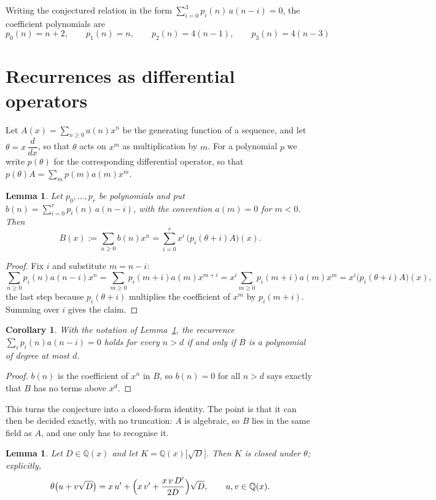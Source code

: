 \documentclass[11pt,a4paper]{article}
\theoremstyle{plain}
\newtheorem{lemma}[theorem]{Lemma}
\newtheorem{corollary}[theorem]{Corollary}
\theoremstyle{definition}
\begin{document}
Writing the conjectured relation in the form $\sum_{i=0}^{3}p_{i}(n)\,a(n-i)=0$,
the coefficient polynomials are
\[
p_{0}(n)=n + 2,\qquad p_{1}(n)=n,\qquad p_{2}(n)=4 \left(n - 1\right),\qquad p_{3}(n)=4 \left(n - 3\right)
\]

\section{Recurrences as differential operators}

Let $A(x)=\sum_{n\ge0}a(n)x^{n}$ be the generating function of a sequence, and let
$\theta=x\,\dfrac{d}{dx}$, so that $\theta$ acts on $x^{m}$ as multiplication by $m$. For a
polynomial $p$ we write $p(\theta)$ for the corresponding differential operator, so that
$p(\theta)A=\sum_{m}p(m)a(m)x^{m}$.

\begin{lemma}\label{lem:transfer}
Let $p_{0},\dots,p_{r}$ be polynomials and put $b(n)=\sum_{i=0}^{r}p_{i}(n)\,a(n-i)$, with
the convention $a(m)=0$ for $m<0$. Then
\[
B(x):=\sum_{n\ge0}b(n)x^{n}=\sum_{i=0}^{r}x^{i}\,\bigl(p_{i}(\theta+i)A\bigr)(x).
\]
\end{lemma}

\begin{proof}
Fix $i$ and substitute $m=n-i$:
\[
\sum_{n\ge0}p_{i}(n)a(n-i)x^{n}=\sum_{m\ge0}p_{i}(m+i)a(m)x^{m+i}
=x^{i}\sum_{m\ge0}p_{i}(m+i)a(m)x^{m}=x^{i}\bigl(p_{i}(\theta+i)A\bigr)(x),
\]
the last step because $p_{i}(\theta+i)$ multiplies the coefficient of $x^{m}$ by
$p_{i}(m+i)$. Summing over $i$ gives the claim.
\end{proof}

\begin{corollary}\label{cor:criterion}
With the notation of Lemma~\ref{lem:transfer}, the recurrence
$\sum_{i}p_{i}(n)a(n-i)=0$ holds for every $n>d$ if and only if $B$ is a polynomial of
degree at most $d$.
\end{corollary}

\begin{proof}
$b(n)$ is the coefficient of $x^{n}$ in $B$, so $b(n)=0$ for all $n>d$ says exactly that
$B$ has no terms above $x^{d}$.
\end{proof}

This turns the conjecture into a closed-form identity. The point is that it can then be
decided exactly, with no truncation: $A$ is algebraic, so $B$ lies in the same field as
$A$, and one only has to recognise it.

\begin{lemma}\label{lem:field}
Let $D\in\mathbb{Q}(x)$ and let $K=\mathbb{Q}(x)\bigl[\sqrt{D}\bigr]$. Then $K$ is closed
under $\theta$; explicitly,
\[
\theta\bigl(u+v\sqrt{D}\bigr)=x\,u'+\Bigl(x\,v'+\frac{x\,v\,D'}{2D}\Bigr)\sqrt{D},
\qquad u,v\in\mathbb{Q}(x).
\]
\end{lemma}
\end{document}
